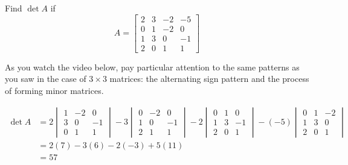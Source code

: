 \documentclass{ximera}
\begin{document}
\begin{example}\label{ex:4by4withVideo}
    Find $\det{A}$ if 
    $$A=\begin{bmatrix} 2 & 3 & -2 & -5\\0 & 1& -2& 0\\1& 3 & 0 &-1\\2&0& 1&1\end{bmatrix}$$

\begin{explanation}
As you watch the video below, pay particular attention to the same patterns as you saw in the case of $3\times 3$ matrices: the alternating sign pattern and the process of forming minor matrices.

\begin{align*}
\det{A}
&=2\begin{vmatrix}1& -2& 0\\3 & 0 &-1\\0& 1&1\end{vmatrix}-3\begin{vmatrix}0 & -2& 0\\1 & 0 &-1\\2& 1&1\end{vmatrix}-2\begin{vmatrix}0 & 1& 0\\1& 3 &-1\\2&0&1\end{vmatrix}-(-5)\begin{vmatrix}0 & 1& -2\\1& 3 & 0 \\2&0& 1\end{vmatrix}\\
&=2(7)-3(6)-2(-3)+5(11)\\
&=57
\end{align*}

\end{explanation}
\end{example}
\end{document}
